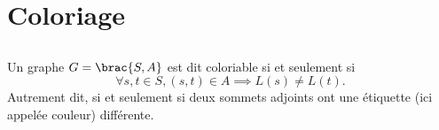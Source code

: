 \section{Coloriage}

\subsection{}
\begin{definition}
Un graphe $G = \brac{S,A}$ est dit coloriable si et seulement si
\begin{equation*}
    \forall s,t \in S, (s,t) \in A \implies L(s) \neq L(t).
\end{equation*}
Autrement dit, si et seulement si deux sommets adjoints ont une étiquette (ici appelée couleur) différente.
\end{definition}

